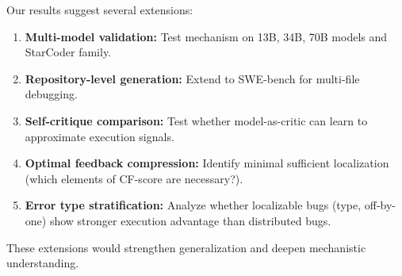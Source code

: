Our results suggest several extensions:

\begin{enumerate}
\item \textbf{Multi-model validation:} Test mechanism on 13B, 34B, 70B models and StarCoder family.
\item \textbf{Repository-level generation:} Extend to SWE-bench for multi-file debugging.
\item \textbf{Self-critique comparison:} Test whether model-as-critic can learn to approximate execution signals.
\item \textbf{Optimal feedback compression:} Identify minimal sufficient localization (which elements of CF-score are necessary?).
\item \textbf{Error type stratification:} Analyze whether localizable bugs (type, off-by-one) show stronger execution advantage than distributed bugs.
\end{enumerate}

These extensions would strengthen generalization and deepen mechanistic understanding.
